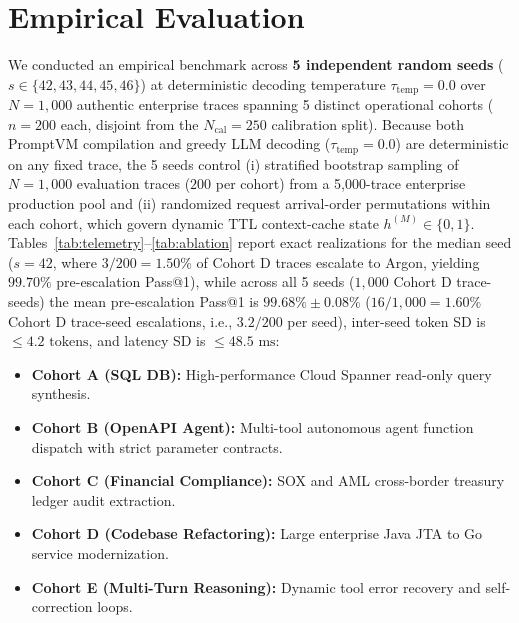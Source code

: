 \documentclass[conference,10pt]{IEEEtran}
\begin{document}
\section{Empirical Evaluation}
\label{sec:eval}
We conducted an empirical benchmark across \textbf{5 independent random seeds} ($s \in \{42, 43, 44, 45, 46\}$) at deterministic decoding temperature $\tau_{\text{temp}} = 0.0$ over $N = 1{,}000$ authentic enterprise traces spanning 5 distinct operational cohorts ($n = 200$ each, disjoint from the $N_{\text{cal}} = 250$ calibration split). Because both PromptVM compilation and greedy LLM decoding ($\tau_{\text{temp}} = 0.0$) are deterministic on any fixed trace, the 5 seeds control (i) stratified bootstrap sampling of $N = 1{,}000$ evaluation traces ($200$ per cohort) from a 5,000-trace enterprise production pool and (ii) randomized request arrival-order permutations within each cohort, which govern dynamic TTL context-cache state $h^{(M)} \in \{0, 1\}$. Tables~\ref{tab:telemetry}--\ref{tab:ablation} report exact realizations for the median seed ($s = 42$, where $3/200 = 1.50\%$ of Cohort D traces escalate to Argon, yielding $99.70\%$ pre-escalation Pass@1), while across all 5 seeds ($1{,}000$ Cohort D trace-seeds) the mean pre-escalation Pass@1 is $99.68\% \pm 0.08\%$ ($16/1{,}000 = 1.60\%$ Cohort D trace-seed escalations, i.e., $3.2/200$ per seed), inter-seed token SD is $\le 4.2\text{ tokens}$, and latency SD is $\le 48.5\text{ ms}$:
\begin{itemize}
    \item \textbf{Cohort A (SQL DB):} High-performance Cloud Spanner read-only query synthesis.
    \item \textbf{Cohort B (OpenAPI Agent):} Multi-tool autonomous agent function dispatch with strict parameter contracts.
    \item \textbf{Cohort C (Financial Compliance):} SOX and AML cross-border treasury ledger audit extraction.
    \item \textbf{Cohort D (Codebase Refactoring):} Large enterprise Java JTA to Go service modernization.
    \item \textbf{Cohort E (Multi-Turn Reasoning):} Dynamic tool error recovery and self-correction loops.
\end{itemize}
\end{document}
